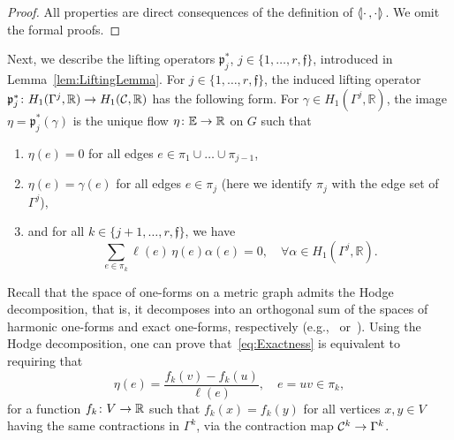 \documentclass[AHL,Unicode,longabstracts]{cedram}
\newcommand{\llangle}{\mathopen{\langle\mkern -3.1mu\lvert}}
\newcommand{\rrangle}{\mathclose{\rvert\mkern -3.1mu\rangle}}
\newcommand{\highinn}[2]{{\llangle#2\rrangle_{#1}}}
\newcommand{\R}{\mathbb{R}}
\newcommand{\E}{\mathbb{E}}
\newcommand{\curve}{\mathcal{C}}
\newcommand{\proj}{\mathfrak{p}}
\newcommand{\fin}{\mathfrak f}
\renewcommand*{\to}{\mathchoice{\longrightarrow}{\rightarrow}{\rightarrow}{\rightarrow}}
\newcommand*{\relabel}{\renewcommand{\labelenumi}{(\theenumi)}}
\newcommand*{\romanenumi}{\renewcommand*{\theenumi}{\roman{enumi}}\relabel}
\let\oldforall\forall
\renewcommand*{\forall}{\mathrel{\oldforall}}
\begin{document}
\begin{proof}
All properties are direct consequences of the definition of $\highinn{}{\cdot\,,\cdot}$. We omit the formal proofs.
\end{proof}

Next, we describe the lifting operators $\proj_j^\ast$, $j \in \{1, \dots,r, \fin \}$, introduced in Lem\-ma~\ref{lem:LiftingLemma}. For $j \in \{1, \dots, r, \fin\}$, the induced lifting operator $\proj_j^\ast \colon H_1(\Gamma^j, \R) \to H_1(\curve, \R)$ has the following form. For $\gamma \in H_1(\Gamma^j, \R)$, the image $\eta = \proj_j^\ast(\gamma)$ is the unique flow $\eta \colon \E \to \R$ on $G$ such that
\begin{enumerate}\romanenumi
\item $\eta(e) = 0$ for all edges $e \in \pi_1\cup \dots \cup \pi_{j-1}$,
\item  $\eta(e) = \gamma(e)$ for all edges $e \in \pi_j$ (here we identify $\pi_j$ with the edge set of $\Gamma^j$),
\item and for all $k \in \{j+1, \dots, r, \fin\}$, we have
\begin{equation}\label{eq:Exactness}
\sum_{e\in \pi_k} \ell(e) \, \eta(e) \alpha(e) = 0, \quad \forall \alpha \in H_1\left(\Gamma^j, \R\right).
\end{equation}
\end{enumerate}



\begin{rema}
Recall that the space of one-forms on a metric graph admits the Hodge decomposition, that is, it decomposes into an orthogonal sum of the spaces of harmonic one-forms and exact one-forms, respectively (e.g.,~\cite[Proposition~3.11]{SW19} or~\cite[eq.~(2.1)]{BF11}). Using the Hodge decomposition, one can prove that~\eqref{eq:Exactness} is equivalent to requiring that
\[
\eta(e) = \frac{f_k(v) - f_k(u)}{\ell(e)}, \quad e= uv \in \pi_k,
\]
for a function $f_k \colon V \to \R$ such that $f_k(x) = f_k(y)$ for all vertices $x, y \in V$ having the same contractions in $\Gamma^k$, via the contraction map $\curve^k \to \Gamma^k$.%
\end{rema}
\end{document}
